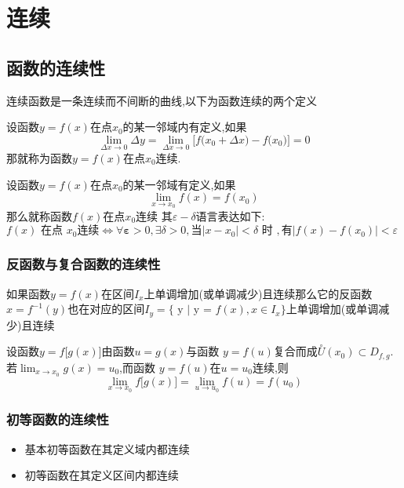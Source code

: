 \documentclass[12pt, a4paper, oneside, UTF8]{ctexbook}
\begin{document}
\begin{sloppypar}

    \else
    \fi
    \chapter{连续}

    \section{函数的连续性}
    连续函数是一条连续而不间断的曲线,以下为函数连续的两个定义
    \begin{defn}{}{}
        设函数$y=f(x)$在点$x_0$的某一邻域内有定义,如果
        $$
            \lim_{\Delta x\to0}\Delta y=\lim_{\Delta x\to0}\big[f\big(x_{0}+\Delta x\big)-f\big(x_{0}\big)\big]=0
        $$
        那就称为函数$y=f(x)$在点$x_0$连续.
    \end{defn}
    \begin{defn}{}{}
        设函数$y=f(x)$在点$x_0$的某一邻域有定义,如果
        $$
            \underset{x\to x_0}{\operatorname*{lim}}f(x)=f(x_0)
        $$
        那么就称函数$f(x)$在点$x_0$连续
        其$\varepsilon - \delta $语言表达如下:\\
        $f(x)\text{ 在点 }x_0\text{连续}\Leftrightarrow\forall\boldsymbol{\varepsilon}>0,\exists\delta>0,\text{当}|x-x_0|<\delta\text{ 时 },\text{有}|f(x)-f(x_0)|<\varepsilon $
    \end{defn}
    \subsection{反函数与复合函数的连续性}
    \begin{defn}{}{}
        如果函数$y=f(x)$在区间$I_x$上单调增加(或单调减少)且连续那么它的反函数 $x=f^{-1}(y)$也在对应的区间$I_{y}=\{\text{ y | y = }f(x),x\in I_{x}\}$上单调增加(或单调减少)且连续
    \end{defn}
    \begin{defn}{}{}
        设函数$y=f\Big[g(x)\Big]$由函数$u=g(x)$与函数 $y=f(u)$复合而成$\stackrel{\circ}{U}(x_0)\subset D_{f,g}$.若$\lim_{x\to x_0}g(x)=u_0$,而函数 $y=f(u)$在$u=u_0$连续,则
        $$\operatorname*{lim}_{x\to x_0}f\Big[g(x)\Big]=\operatorname*{lim}_{u\to u_0}f(u)=f(u_0)$$
    \end{defn}
    \subsection{初等函数的连续性}
    \begin{defn}{}{}
        \begin{itemize}
            \item 基本初等函数在其定义域内都连续
            \item 初等函数在其定义区间内都连续
        \end{itemize}
    \end{defn}

\end{sloppypar}
\end{document}
